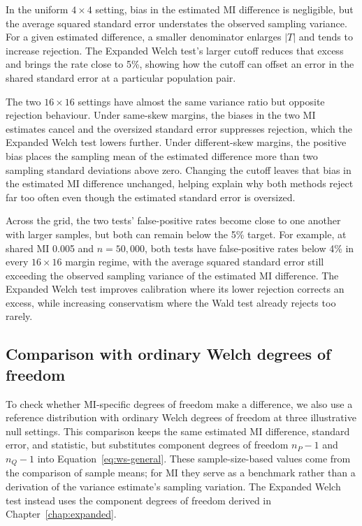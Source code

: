 \begin{table}[H]
\centering
\caption{Estimation errors and false-positive rates at three illustrative null settings.}
\label{tab:balanced-null-diagnostics}
\thesistableformat

\end{table}

In the uniform \(4\times4\) setting, bias in the estimated MI difference
is negligible, but the average squared standard error understates the observed sampling
variance. For a given estimated difference, a smaller denominator enlarges
\(|T|\) and tends to increase rejection. The Expanded Welch test's larger cutoff reduces that excess and brings the rate close to 5\%, showing how the
cutoff can offset an error in the shared standard error at a
particular population pair.

The two \(16\times16\) settings have almost the same variance ratio
but opposite rejection behaviour. Under same-skew margins, the biases in
the two MI estimates cancel and the oversized standard error suppresses
rejection, which the Expanded Welch test lowers further. Under different-skew
margins, the positive bias places the sampling mean of the estimated
difference more than two sampling standard deviations above zero. Changing the cutoff
leaves that bias in the estimated MI difference unchanged, helping explain
why both methods reject far too often even though the estimated standard
error is oversized.

Across the grid, the two tests' false-positive rates become close to one
another with larger samples, but both can remain below the 5\% target.
For example, at
shared MI 0.005 and \(n=50{,}000\), both tests have false-positive rates below 4\% in
every \(16\times16\) margin regime, with the average squared standard
error still exceeding the observed sampling variance of the estimated MI
difference. The Expanded Welch test improves calibration where its lower rejection
corrects an excess, while increasing
conservatism where the Wald test already rejects too rarely.

\subsection{Comparison with ordinary Welch degrees of freedom}

To check whether MI-specific degrees of freedom make a difference, we also
use a reference distribution with ordinary Welch degrees of freedom at three
illustrative null settings.
This comparison keeps the same estimated MI difference, standard error, and
statistic, but substitutes component degrees of freedom \(n_P-1\) and
\(n_Q-1\) into Equation~\eqref{eq:ws-general}. These sample-size-based
values come from the comparison of sample means; for MI they serve as a
benchmark rather than a derivation of the variance estimate's sampling
variation. The Expanded Welch test instead uses the component degrees of freedom
derived in Chapter~\ref{chap:expanded}.


